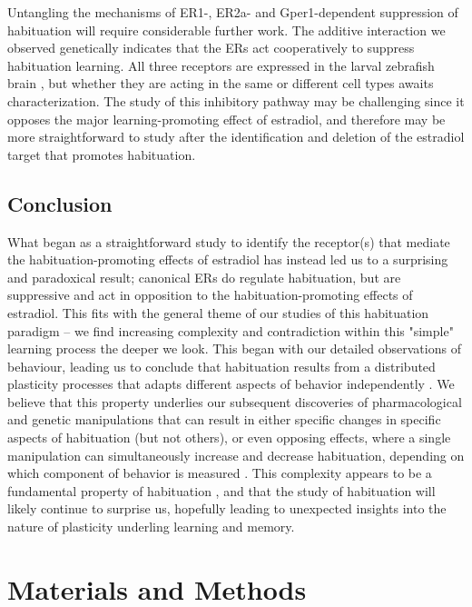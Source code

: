 \documentclass[10pt,lineno]{RandlettLab_elife}
\begin{document}
{Untangling the mechanisms of ER1-, ER2a- and Gper1-dependent suppression of habituation will require considerable further work. 
The additive interaction we observed genetically indicates that the ERs act cooperatively to suppress habituation learning.
All three receptors are expressed in the larval zebrafish brain \citep{Thisse2008-vr,Romano2017-ep}, but whether they are acting in the same or different cell types awaits characterization. 
The study of this inhibitory pathway may be challenging since it opposes the major learning-promoting effect of estradiol, and therefore may be more straightforward to study after the identification and deletion of the estradiol target that promotes habituation. 

\subsection{Conclusion}

What began as a straightforward study to identify the receptor(s) that mediate the habituation-promoting effects of estradiol has instead led us to a surprising and paradoxical result; 
canonical ERs do regulate habituation, but are suppressive and act in opposition to the habituation-promoting effects of estradiol. 
This fits with the general theme of our studies of this habituation paradigm -- we find increasing complexity and contradiction within this "simple" learning process the deeper we look. 
This began with our detailed observations of behaviour, leading us to conclude that habituation results from a distributed plasticity processes that adapts different aspects of behavior independently \citep{Randlett2019-fj}. 
We believe that this property underlies our subsequent discoveries of pharmacological and genetic manipulations that can result in either specific changes in specific aspects of habituation (but not others), or even opposing effects, where a single manipulation can simultaneously increase and decrease habituation, depending on which component of behavior is measured \citep{Randlett2019-fj,Lamire2023-he}.
This complexity appears to be a fundamental property of habituation \citep{McDiarmid2019-td}, and that the study of habituation will likely continue to surprise us, hopefully leading to unexpected insights into the nature of plasticity underling learning and memory.

\section{Materials and Methods}

}
\end{document}
